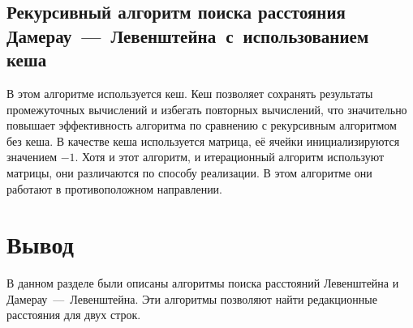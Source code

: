 \subsection{Рекурсивный алгоритм поиска расстояния \\ \mbox{Дамерау~---~Левенштейна с использованием} \\ кеша}

В этом алгоритме используется кеш. Кеш позволяет сохранять результаты промежуточных вычислений и избегать повторных вычислений, что значительно повышает эффективность алгоритма по сравнению с рекурсивным алгоритмом без кеша.
В качестве кеша используется матрица, её ячейки инициализируются значением $-1$. Хотя и этот алгоритм, и итерационный алгоритм используют матрицы, они различаются по способу реализации. В этом алгоритме они работают в противоположном направлении.

\section*{Вывод}
В данном разделе были описаны алгоритмы поиска расстояний Левенштейна и Дамерау~---~Левенштейна. Эти алгоритмы позволяют найти редакционные расстояния для двух строк.

